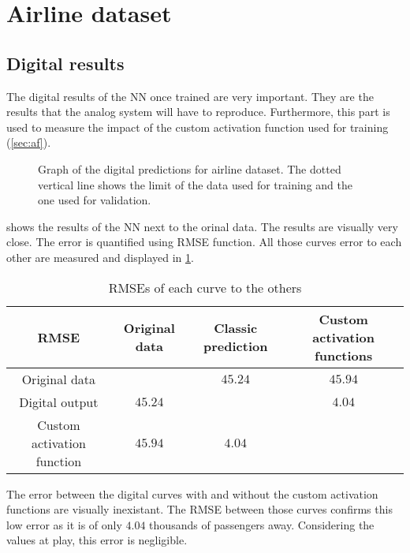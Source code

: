 \section{Airline dataset}
\label{sec:resAirline}

\subsection{Digital results}
\label{subsec:digitalAirline}

The digital results of the \ac{NN} once trained are very important. They are the results that the analog system will have to reproduce. Furthermore, this part is used to measure the impact of the custom activation function used for training (\cref{sec:af}).

\begin{figure}[H]
  \centering
  
  \caption{Graph of the digital predictions for airline dataset. The dotted vertical line shows the limit of the data used for training and the one used for validation.}
  \label{graph:airlineDigital}
\end{figure}

 shows the results of the \ac{NN} next to the orinal data. The results are visually very close. The error is quantified using \ac{RMSE} function. All those curves error to each other are measured and displayed in \cref{tab:airlineDigital}.

\begin{table}[H]
  \centering
  \begin{tabular}{|c|c|c|c|}
    \hline
    \cellcolor[HTML]{808080}\acs{RMSE} & Original data & Classic prediction & Custom activation functions\\
    \hline
    Original data &\cellcolor[HTML]{202020} & $45.24$ & $45.94$\\
    \hline
    Digital output & $45.24$ & \cellcolor[HTML]{202020} & $4.04$\\
    \hline
    Custom activation function & $45.94$ & $4.04$ & \cellcolor[HTML]{202020}\\
    \hline
  \end{tabular}
  \caption{\acp{RMSE} of each curve to the others}
  \label{tab:airlineDigital}
\end{table}

The error between the digital curves with and without the custom activation functions are visually inexistant. The \ac{RMSE} between those curves confirms this low error as it is of only $4.04$ thousands of passengers away. Considering the values at play, this error is negligible.

